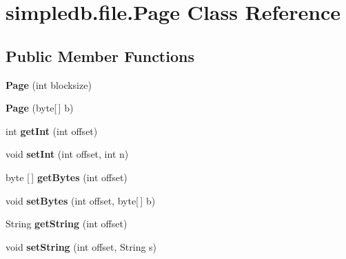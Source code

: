 \hypertarget{classsimpledb_1_1file_1_1Page}{}\section{simpledb.\+file.\+Page Class Reference}
\label{classsimpledb_1_1file_1_1Page}
\subsection*{Public Member Functions}
\begin{DoxyCompactItemize}
\item 
\mbox{\label{classsimpledb_1_1file_1_1Page_ae21de0be979b1824b4b93e7f6bfee5b0}} 
{\bfseries Page} (int blocksize)
\item 
\mbox{\label{classsimpledb_1_1file_1_1Page_a6ede4928294ec9856bc330f1f3f6c4db}} 
{\bfseries Page} (byte\mbox{[}$\,$\mbox{]} b)
\item 
\mbox{\label{classsimpledb_1_1file_1_1Page_a0f0a2e7d2c41b497aea226945abc6a23}} 
int {\bfseries get\+Int} (int offset)
\item 
\mbox{\label{classsimpledb_1_1file_1_1Page_a6efd96626767198fca6f71b633adc3fb}} 
void {\bfseries set\+Int} (int offset, int n)
\item 
\mbox{\label{classsimpledb_1_1file_1_1Page_ade180a322c6316e36732bf25c65d4844}} 
byte \mbox{[}$\,$\mbox{]} {\bfseries get\+Bytes} (int offset)
\item 
\mbox{\label{classsimpledb_1_1file_1_1Page_a88fc8b20b39a2e0958961d5a751ece53}} 
void {\bfseries set\+Bytes} (int offset, byte\mbox{[}$\,$\mbox{]} b)
\item 
\mbox{\label{classsimpledb_1_1file_1_1Page_a7f27e70f20666690f79e4fb564e95d7f}} 
String {\bfseries get\+String} (int offset)
\item 
\mbox{\label{classsimpledb_1_1file_1_1Page_ae828488b856f2993924e5b06ce4f2346}} 
void {\bfseries set\+String} (int offset, String s)
\end{DoxyCompactItemize}

